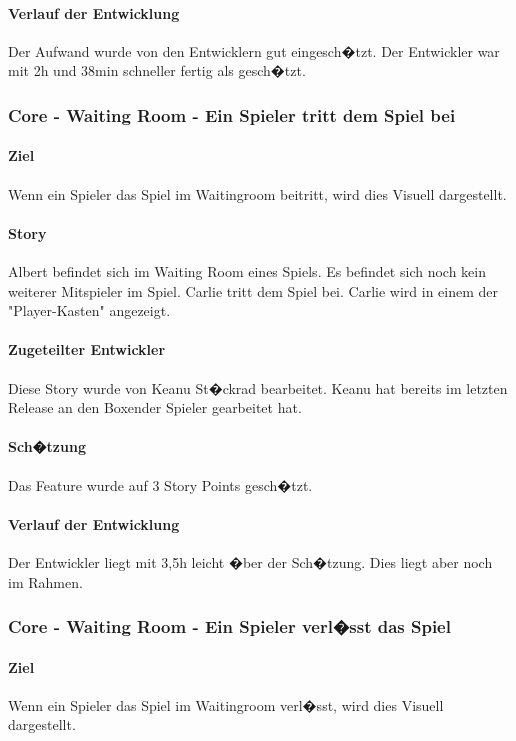\documentclass[12pt, titlepage]{scrartcl}
\begin{document}
			\paragraph{Verlauf der Entwicklung} 
			Der Aufwand wurde von den Entwicklern gut eingesch�tzt. Der Entwickler war mit 2h und 38min schneller fertig als gesch�tzt. 
			
			\subsubsection{Core - Waiting Room - Ein Spieler tritt dem Spiel bei}
			\paragraph{Ziel} Wenn ein Spieler das Spiel im Waitingroom beitritt, wird dies Visuell dargestellt.
			\paragraph{Story} Albert befindet sich im Waiting Room eines Spiels. Es befindet sich noch kein weiterer Mitspieler im Spiel. Carlie tritt dem Spiel bei. Carlie wird in einem der "Player-Kasten" angezeigt.
			\paragraph{Zugeteilter Entwickler} Diese Story wurde von Keanu St�ckrad bearbeitet. Keanu hat bereits im letzten Release an den \glqq Boxen\grqq der Spieler gearbeitet hat.
			\paragraph{Sch�tzung}
			Das Feature wurde auf 3 Story Points gesch�tzt.
			\paragraph{Verlauf der Entwicklung} 
			Der Entwickler liegt mit 3,5h leicht �ber der Sch�tzung. Dies liegt aber noch im Rahmen.
			
			\subsubsection{Core - Waiting Room - Ein Spieler verl�sst das Spiel}
			\paragraph{Ziel} Wenn ein Spieler das Spiel im Waitingroom verl�sst, wird dies Visuell dargestellt.
\end{document}
